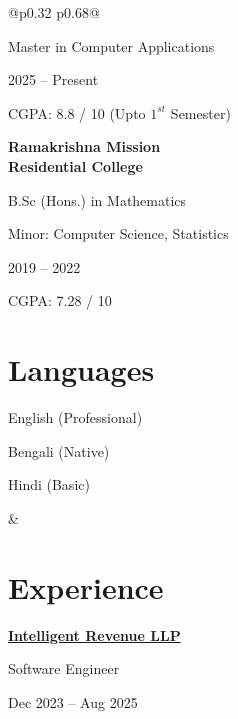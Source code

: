 \documentclass[a4paper,10pt]{article}
\begin{document}
\begin{tabularx}{\textwidth}{@{}p{0.32\textwidth} p{0.68\textwidth}@{}}
\begin{minipage}[t]{\linewidth}
Master in Computer Applications

2025 -- Present

CGPA: 8.8 / 10 (Upto $1^{st}$ Semester)

\vspace{6pt}

\textbf{Ramakrishna Mission \\ Residential College}

B.Sc (Hons.) in Mathematics

Minor: Computer Science, Statistics

2019 -- 2022

CGPA: 7.28 / 10

\vspace{6pt}


\section*{Languages}

English (Professional)

Bengali (Native)

Hindi (Basic)

\end{minipage}

&


\begin{minipage}[t]{\linewidth}

\section*{Experience}

\textbf{\href{https://www.intellirevenue.com}{Intelligent Revenue LLP}}

Software Engineer

Dec 2023 -- Aug 2025

\begin{experiencelist}


\end{experiencelist}
\end{minipage}
\end{tabularx}
\end{document}
